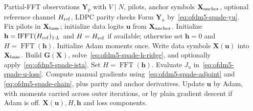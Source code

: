 \documentclass[journal]{IEEEtran}
\begin{document}
\begin{algorithm}[t]
\caption{OFDM5 manual-gradient SPADE-style solver}
\label{alg:ofdm5-spade}
\footnotesize
\begin{algorithmic}[1]
\Require Partial-FFT observations \(\mathbf Y_p\) with \(V\mid N\), pilots, anchor
  symbols \(\mathbf X_{\rm anchor}\), optional reference channel \(H_{\rm ref}\),
  LDPC parity checks
\State Form \(\mathbf Y_u\) by~\eqref{eq:ofdm5-spade-yu}.
\State Fix pilots in \(\mathbf X_{\rm base}\); initialize data logits
  \(\mathbf u\) from \(\mathbf X_{\rm anchor}\).
\State Initialize \(\mathbf h=\operatorname{IFFT}(H_{\rm ref})_{1:L}\) and
  \(H=H_{\rm ref}\) if available; otherwise set \(\mathbf h=0\) and
  \(H=\operatorname{FFT}(\mathbf h)\).
\State Initialize Adam moments once.
  \State Write data symbols \(\mathbf X(\mathbf u)\) into \(\mathbf X_{\rm base}\).
  \State Build \(\mathbf G(\mathbf X)\), solve~\eqref{eq:ofdm5-spade-h-ridge},
    and optionally apply~\eqref{eq:ofdm5-spade-ista}.
  \State Set \(H=\operatorname{FFT}(\mathbf h)\).
    \State Evaluate \(J_u\) in~\eqref{eq:ofdm5-spade-u-loss}.
    \State Compute manual gradients using~\eqref{eq:ofdm5-spade-adjoint} and
      \eqref{eq:ofdm5-spade-chain}, plus parity and anchor derivatives.
    \State Update \(\mathbf u\) by Adam, with moments carried across outer
      iterations, or by plain gradient descent if Adam is off.
  \EndFor
\EndFor
\State \Return \(\mathbf X(\mathbf u),H,\mathbf h\) and loss components.
\end{algorithmic}
\end{algorithm}
\end{document}

